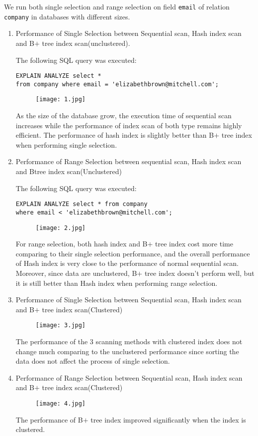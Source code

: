 \documentclass[a4paper]{article}
\begin{document}
We run both single selection and range selection on field \texttt{email} of relation \texttt{company} in databases with different sizes.
\begin{enumerate}
	\item Performance of Single Selection between Sequential scan, Hash index scan and B$+$ tree index scan(unclustered).
    
    The following SQL query was executed:
    \begin{lstlisting}
EXPLAIN ANALYZE select * 
from company where email = 'elizabethbrown@mitchell.com';
    \end{lstlisting}
    
    \begin{figure}[H]
    \centering
    \texttt{[image: 1.jpg]}
    \caption{}
    \end{figure}
As the size of the database grow, the execution time of sequential scan increases while the performance of index scan of both type remains highly efficient. The performance of hash index is slightly better than B$+$ tree index when performing single selection.

    \item Performance of Range Selection between sequential scan, Hash index scan and Btree index scan(Unclustered) 
    
    The following SQL query was executed:
    \begin{lstlisting}
EXPLAIN ANALYZE select * from company 
where email < 'elizabethbrown@mitchell.com';
    \end{lstlisting}
    \begin{figure}[H]
    \centering
    \texttt{[image: 2.jpg]}
    \caption{}
    \end{figure}
For range selection, both hash index and B$+$ tree index cost more time comparing to their single selection performance, and the overall performance of Hash index is very close to the performance of normal sequential scan. Moreover, since data are unclustered, B$+$ tree index doesn't perform well, but it is still better than Hash index when performing range selection.
    \item Performance of Single Selection between Sequential scan, Hash index scan and B$+$ tree index scan(Clustered)
    \begin{figure}[H]
    \centering
    \texttt{[image: 3.jpg]}
    \caption{}
    \end{figure}
The performance of the 3 scanning methods with clustered index does not change much comparing to the unclustered performance since sorting the data does not affect the process of single selection.  
    \item Performance of Range Selection between Sequential scan, Hash index scan and B$+$ tree index scan(Clustered)
    \begin{figure}[H]
    \centering
    \texttt{[image: 4.jpg]}
    \caption{}
    \end{figure}
The performance of B$+$ tree index improved significantly when the index is clustered.
    
\end{enumerate}
\end{document}
